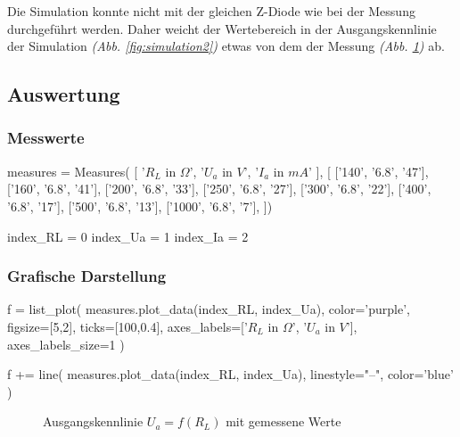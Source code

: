 \documentclass[a4paper]{hitec}
\begin{document}
Die Simulation konnte nicht mit der gleichen Z-Diode wie bei der Messung durchgeführt werden.
Daher weicht der Wertebereich in der Ausgangskennlinie der Simulation \textit{(Abb. \ref{fig:simulation2})} etwas von dem der Messung \textit{(Abb. \ref{fig:measure2})} ab.

\subsection{Auswertung}

\subsubsection{Messwerte}

\begin{sagesilent}
    measures = Measures(
        [
            '$R_L$ in $\Omega$',
            '$U_a$ in $V$', 
            '$I_a$ in $mA$'
        ], [
            ['140', '6.8', '47'],
            ['160', '6.8', '41'],
            ['200', '6.8', '33'],
            ['250', '6.8', '27'],
            ['300', '6.8', '22'],
            ['400', '6.8', '17'],
            ['500', '6.8', '13'],
            ['1000', '6.8', '7'],
    ])

    index_RL = 0
    index_Ua = 1
    index_Ia = 2
\end{sagesilent}

\begin{center}
    \renewcommand{\arraystretch}{1.2}
\end{center}

\subsubsection{Grafische Darstellung}

\begin{sagesilent}
    f = list_plot(
        measures.plot_data(index_RL, index_Ua),
        color='purple',
        figsize=[5,2],
        ticks=[100,0.4],
        axes_labels=['$R_L$ in $\Omega$', '$U_a$ in $V$'],
        axes_labels_size=1
    )

    f += line(
        measures.plot_data(index_RL, index_Ua),
        linestyle="--",
        color='blue'
    )
\end{sagesilent}

\begin{figure}[H]
    \centering
    \caption{Ausgangskennlinie \textbf{$U_{a} = f(R_L)$} mit gemessene Werte}
    \label{fig:measure2}
\end{figure}
\end{document}
